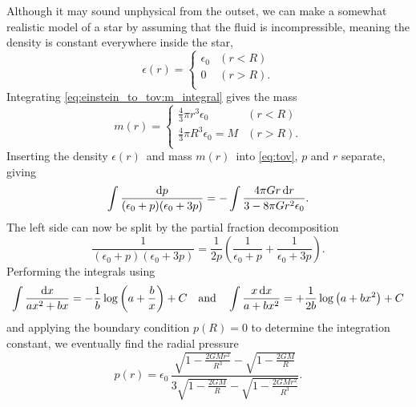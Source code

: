 Although it may sound unphysical from the outset, we can make a somewhat realistic model of a star by assuming that the fluid is incompressible, meaning the density is constant everywhere inside the star,
\begin{equation}
	\epsilon(r) = 
	\begin{cases} 
		\epsilon_0 & (r < R)   \\
		0          & (r > R) . \\
	\end{cases}
\end{equation}
Integrating \cref{eq:einstein_to_tov:m_integral} gives the mass
\begin{equation}
	m(r) = 
	\begin{cases}
		\frac{4}{3} \pi r^3 \epsilon_0     & (r < R)   \\
		\frac{4}{3} \pi R^3 \epsilon_0 = M & (r > R) . \\
	\end{cases}
\end{equation}
Inserting the density $\epsilon(r)$ and mass $m(r)$ into \cref{eq:tov}, $p$ and $r$ separate, giving
\begin{equation*}
	\int \frac{\mathop{}\!\mathrm{d} p}{(\epsilon_0+p)(\epsilon_0+3p)} = - \int \frac{4 \pi G r \mathop{}\!\mathrm{d} r}{3-8\pi G r^2 \epsilon_0} .
\end{equation*}
The left side can now be split by the partial fraction decomposition
\begin{equation*}
	\frac{1}{(\epsilon_0+p)(\epsilon_0+3p)} = \frac{1}{2p} \left( \frac{1}{\epsilon_0+p} + \frac{1}{\epsilon_0+3p} \right) .
\end{equation*}
Performing the integrals using
\begin{equation*}
	\int \frac{\mathop{}\!\mathrm{d} x}{a x^2 + b x} = -\frac{1}{b} \log \left( a + \frac{b}{x} \right) + C
	\quad \text{and} \quad
	\int \frac{x \mathop{}\!\mathrm{d} x}{a + b x^2} = +\frac{1}{2 b} \log \left( a + b x^2 \right) + C
\end{equation*}
and applying the boundary condition $p(R) = 0$ to determine the integration constant, we eventually find the radial pressure
\begin{equation}
	p(r) = \epsilon_0 \, \frac{\sqrt{1-\frac{2GMr^2}{R^3}} - \sqrt{1-\frac{2GM}{R}}}{3 \sqrt{1-\frac{2GM}{R}} - \sqrt{1-\frac{2GMr^2}{R^3}}} .
\end{equation}

